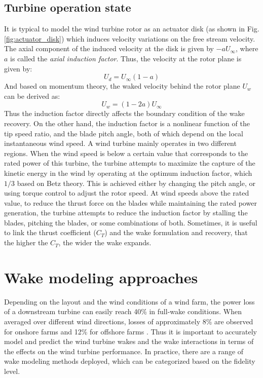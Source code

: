 \documentclass{umthesis}
\begin{document}
\subsection{Turbine operation state}
It is typical to model the wind turbine rotor as an actuator disk (as shown in Fig. \ref{fig:actuator_disk}) which induces velocity variations on the free stream velocity. The axial component of the induced velocity at the disk is given by $-aU_\infty$, where $a$ is called the \textit{axial induction factor}. Thus, the velocity at the rotor plane is given by:
\begin{equation}
 U_d=U_\infty(1-a)
\end{equation}
And based on momentum theory, the waked velocity behind the rotor plane $U_w$ can be derived as:
\begin{equation}
 U_w=(1-2a)U_\infty
\end{equation}
Thus the induction factor directly affects the boundary condition of the wake recovery. On the other hand, the induction factor is a nonlinear function of the tip speed ratio, and the blade pitch angle, both of which depend on the local instantaneous wind speed. A wind turbine mainly operates in two different regions. When the wind speed is below a certain value that corresponds to the rated power of this turbine, the turbine attempts to maximize the capture of the kinetic energy in the wind by operating at the optimum induction factor, which $1/3$ based on Betz theory. This is achieved either by changing the pitch angle, or using torque control to adjust the rotor speed. At wind speeds above the rated value, to reduce the thrust force on the blades while maintaining the rated power generation, the turbine attempts to reduce the induction factor by stalling the blades, pitching the blades, or some combinations of both. Sometimes, it is useful to link the thrust coefficient ($C_T$) and the wake formulation and recovery, that the higher the $C_T$, the wider the wake expands.



\section{Wake modeling approaches}
Depending on the layout and the wind conditions of a wind farm, the power loss of a downstream turbine can easily reach 40\% in full-wake conditions. When averaged over different wind directions, losses of approximately 8\% are observed for onshore farms and 12\% for offshore farms \cite{Barthelmie_2008}. Thus it is important to accurately model and predict the wind turbine wakes and the wake interactions in terms of the effects on the wind turbine performance. In practice, there are a range of wake modeling methods deployed, which can be categorized based on the fidelity level.
\end{document}
